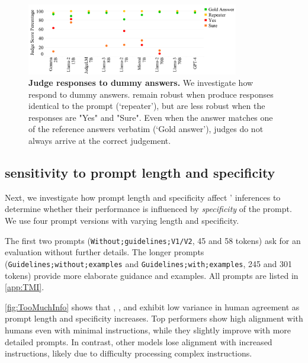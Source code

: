 \begin{figure}[t]
    \centering
    \includegraphics[width=0.825\textwidth]{figures/ConstantV2.pdf}
    \caption{\textbf{Judge responses to dummy answers.} 
    We investigate how \judgemodels respond to dummy answers.
    \judgemodels remain robust when \evaluatormodels produce responses identical to the prompt (`repeater'), but are less robust when the responses are "Yes" and "Sure". Even when the answer matches one of the reference answers verbatim (`Gold answer'), judges do not always arrive at the correct judgement.
    }
    \label{fig:judge_dummy}
\end{figure}

\subsection{\Judgemodel sensitivity to prompt length and specificity}
\label{sec:analysis:subsec:instructions}

Next, we investigate how prompt length and specificity affect \judgemodels' inferences to determine whether their performance is influenced by \textit{specificity} of the prompt. We use four prompt versions with varying length and specificity.

The first two prompts (\texttt{Without;guidelines;V1/V2}, 45 and 58 tokens) ask for an evaluation without further details. The longer prompts (\texttt{Guidelines;without;examples} and \texttt{Guidelines;with;examples}, 245 and 301 tokens) provide more elaborate guidance and examples. All prompts are listed in \cref{app:TMI}.

\cref{fig:TooMuchInfo} shows that \judge{\gpt}, , and  exhibit low variance in human agreement as prompt length and specificity increases. Top performers show high alignment with humans even with minimal instructions, while they slightly improve with more detailed prompts. In contrast, other models lose alignment with increased instructions, likely due to difficulty processing complex instructions.

